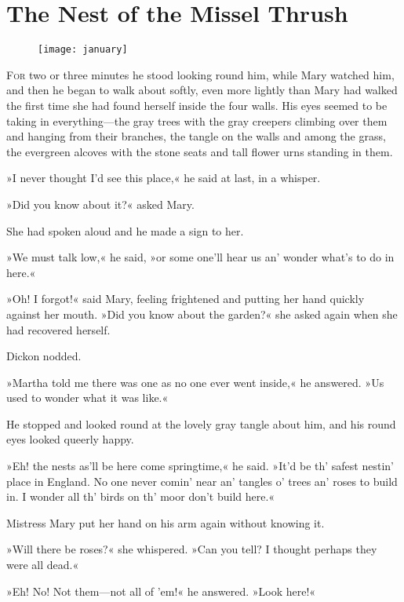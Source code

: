 \chapter{The Nest of the Missel Thrush} 
	
\begin{figure}[t!]
\centering
\texttt{[image: january]}
\end{figure}

 \lettrine[lines=6]{F}{or} two or three minutes he stood looking round him, while Mary watched him, and then he began to walk about softly, even more lightly than Mary had walked the first time she had found herself inside the four walls. His eyes seemed to be taking in everything—the gray trees with the gray creepers climbing over them and hanging from their branches, the tangle on the walls and among the grass, the evergreen alcoves with the stone seats and tall flower urns standing in them.

»I never thought I'd see this place,« he said at last, in a whisper.

»Did you know about it?« asked Mary.

She had spoken aloud and he made a sign to her.

»We must talk low,« he said, »or some one'll hear us an' wonder what's to do in here.«

»Oh! I forgot!« said Mary, feeling frightened and putting her hand quickly against her mouth. »Did you know about the garden?« she asked again when she had recovered herself.

Dickon nodded.

»Martha told me there was one as no one ever went inside,« he answered. »Us used to wonder what it was like.«

He stopped and looked round at the lovely gray tangle about him, and his round eyes looked queerly happy.

»Eh! the nests as'll be here come springtime,« he said. »It'd be th' safest nestin' place in England. No one never comin' near an' tangles o' trees an' roses to build in. I wonder all th' birds on th' moor don't build here.«

Mistress Mary put her hand on his arm again without knowing it.

»Will there be roses?« she whispered. »Can you tell? I thought perhaps they were all dead.«

»Eh! No! Not them—not all of 'em!« he answered. »Look here!«

